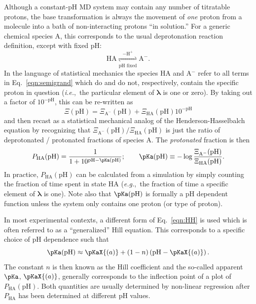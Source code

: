 Although a constant-pH MD system may contain any number of titratable protons,
  the base transformation is always the movement of \emph{one} proton from a
  molecule into a bath of non-interacting protons ``in solution.''
For a generic chemical species A, this corresponds to the usual deprotonation
  reaction definition, except with fixed pH:
\begin{equation*}
 \mathrm{
  HA
  \underset{\text{pH fixed}}{\stackrel{-H^{+}}{\rightleftharpoons}}
  A^{-}
 }.
\end{equation*}
In the language of statistical mechanics the species HA and A$^{-}$ refer to
  all terms in Eq.~\eqref{eqn:semigrand} which do and do not, respectively,
  contain the specific proton in question (\textit{i.e.},~the particular
  element of ${\bm \lambda}$ is one or zero).
By taking out a factor of $10^{-\text{pH}}$, this can be re-written as
\begin{equation*}
  \Xi(\text{pH})
  =
  \Xi_{\text{A}^{-}}(\text{pH})
  +
  \Xi_{\text{HA}}(\text{pH}) 10^{-\text{pH}}
\end{equation*}
  and then recast as a statistical mechanical analog of the 
  Henderson-Hasselbalch equation by recognizing that
  $\Xi_{\text{A}^{-}}(\text{pH}) / \Xi_{\text{HA}}(\text{pH})$ is just the
  ratio of deprotonated / protonated fractions of species A.
The \emph{protonated} fraction is then
\begin{equation}\label{eqn:HH}
  P_{\text{HA}}(\text{pH})
  =
  \frac{1}{1 + 10^{\text{pH} - \pKa(\text{pH})}};
  \qquad
  \pKa(\text{pH})
  \equiv
  -\log{
    \frac{
      \Xi_{\text{A}^{-}}(\text{pH})
    }{
      \Xi_{\text{HA}}(\text{pH})
    }
  }.
\end{equation}
In practice, $P_{\text{HA}}(\text{pH})$ can be calculated from a simulation by
  simply counting the fraction of time spent in state HA (\textit{e.g.},~the
  fraction of time a specific element of ${\bm \lambda}$ is one).
Note also that $\pKa(\text{pH})$ is formally a pH dependent function
  unless the system only contains one proton (or type of proton).

In most experimental contexts, a different form of Eq.~\eqref{eqn:HH} is used
  which is often referred to as a ``generalized'' Hill equation.
This corresponds to a specific choice of pH dependence such that
\begin{equation*}
  \pKa(\text{pH})
  \approx
  \pKaX{(a)}
  +
  (1 - n)\left(\text{pH} - \pKaX{(a)}\right).
\end{equation*}
The constant $n$ is then known as the Hill coefficient and the so-called
  apparent $\pKa$, $\pKaX{(a)}$, generally corresponds to the inflection point
  of a plot of $P_{\text{HA}}(\text{pH})$.
Both quantities are usually determined by non-linear regression after
  $P_{\text{HA}}$ has been determined at different pH values.

